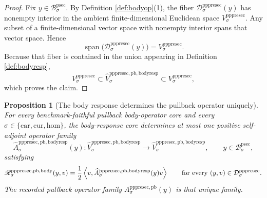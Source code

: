 \documentclass[11pt]{article}
\newcommand{\Car}{\mathrm{car}}
\newcommand{\Cur}{\mathrm{cur}}
\newcommand{\Hom}{\mathrm{hom}}
\newcommand{\ProtoSectionBody}[1]{\mathcal B_{#1}^{\mathrm{psec}}}
\newcommand{\PrePreProtoSectionVertical}[1]{V_{#1}^{\mathrm{pppresec}}}
\newcommand{\PrePreProtoSectionResidualBody}[1]{\mathcal D_{#1}^{\mathrm{pppresec}}}
\newcommand{\PrePreProtoSectionPullbackOperator}[1]{A_{#1}^{\mathrm{pppresec,pb}}}
\newcommand{\PrePreProtoSectionBodyResponse}[1]{\mathscr R_{#1}^{\mathrm{pppresec,pb,body}}}
\newcommand{\RecoveredBodyResponseSpace}[1]{\widehat V_{#1}^{\mathrm{pppresec,pb,bodyresp}}}
\newcommand{\RecoveredBodyResponseOperator}[1]{\widehat A_{#1}^{\mathrm{pppresec,pb,bodyresp}}}
\newtheorem{proposition}{Proposition}
\begin{document}
\begin{proof}
Fix \(y\in\ProtoSectionBody{\sigma}\). By Definition \ref{def:bodyop}(1), the fiber \(\PrePreProtoSectionResidualBody{\sigma}(y)\) has nonempty interior in the ambient finite-dimensional Euclidean space \(\PrePreProtoSectionVertical{\sigma}\). Any subset of a finite-dimensional vector space with nonempty interior spans that vector space. Hence
\[
\operatorname{span}\bigl(\PrePreProtoSectionResidualBody{\sigma}(y)\bigr)
=
\PrePreProtoSectionVertical{\sigma}.
\]
Because that fiber is contained in the union appearing in Definition \ref{def:bodyresp},
\[
\PrePreProtoSectionVertical{\sigma}
\subset
\RecoveredBodyResponseSpace{\sigma}
\subset
\PrePreProtoSectionVertical{\sigma},
\]
which proves the claim.
\end{proof}

\begin{proposition}[The body response determines the pullback operator uniquely]
\label{prop:recover_operator}
For every benchmark-faithful pullback body-operator core and every \(\sigma\in\{\Car,\Cur,\Hom\}\), the body-response core determines at most one positive self-adjoint operator family
\[
\RecoveredBodyResponseOperator{\sigma}(y):
\RecoveredBodyResponseSpace{\sigma}\to\RecoveredBodyResponseSpace{\sigma},
\qquad
y\in\ProtoSectionBody{\sigma},
\]
satisfying
\begin{equation}
\PrePreProtoSectionBodyResponse{\sigma}(y,v)
=
\frac{1}{2}
\ev{v,\RecoveredBodyResponseOperator{\sigma}(y)v}
\qquad
\text{for every }(y,v)\in\PrePreProtoSectionResidualBody{\sigma}.
\label{eq:bodyresp}
\end{equation}
The recorded pullback operator family \(\PrePreProtoSectionPullbackOperator{\sigma}(y)\) is that unique family.
\end{proposition}
\end{document}
